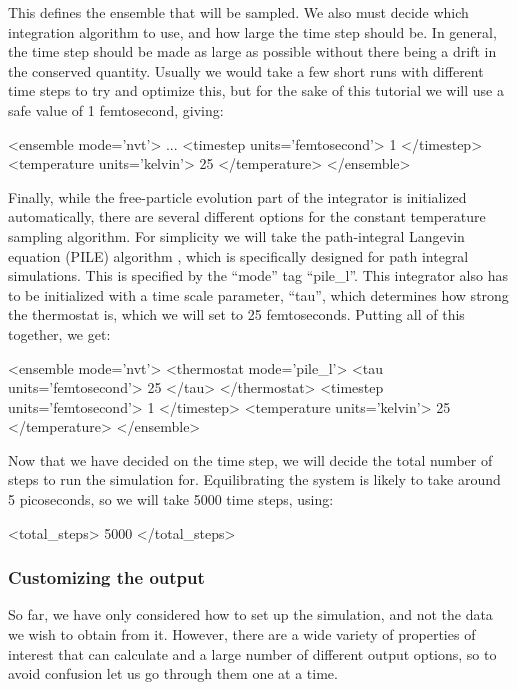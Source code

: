 \documentclass[11pt,english,fleqn]{report}
\newenvironment{code}{%
\footnotesize 
\verbatim
}{
\endverbatim
\normalsize
}
\begin{document}
This defines the ensemble that will be sampled. We also must decide
which integration algorithm to use, and how large the time step should
be. In general, the time step should be made as large as possible
without there being a drift in the conserved quantity. Usually we
would take a few short runs with different time steps to try and optimize
this, but for the sake of this tutorial we will use a safe value of
1 femtosecond, giving:

\begin{code}
<ensemble mode='nvt'>
   ...
   <timestep units='femtosecond'> 1 </timestep>
   <temperature units='kelvin'> 25 </temperature>
</ensemble>
\end{code}

Finally, while the free-particle evolution part of the integrator
is initialized automatically, there are several different options
for the constant temperature sampling algorithm. For simplicity we
will take the path-integral Langevin equation (PILE) algorithm \cite{ceri+10jcp},
which is specifically designed for path integral simulations. 
This is specified by the {}``mode'' tag {}``pile\_l''. 
This integrator also has to
be initialized with a time scale parameter, {}``tau'', which determines
how strong the thermostat is, which we will set to 25 femtoseconds. 
Putting all of this together, we get:

\begin{code}
<ensemble mode='nvt'>
   <thermostat mode='pile_l'>
      <tau units='femtosecond'> 25 </tau>
   </thermostat>
   <timestep units='femtosecond'> 1 </timestep>
   <temperature units='kelvin'> 25 </temperature>
</ensemble>
\end{code}

Now that we have decided on the time step, we will decide the total
number of steps to run the simulation for. Equilibrating the system
is likely to take around 5 picoseconds, so we will take 5000 time
steps, using:

\begin{code}
<total_steps> 5000 </total_steps>
\end{code}

\subsubsection{Customizing the output}

So far, we have only considered how to set up the simulation, and not
the data we wish to obtain from it. However, there are a wide
variety of properties of interest that \ipi can calculate 
and a large number of different output
options, so to avoid confusion let us go through them one at a time.
\end{document}
